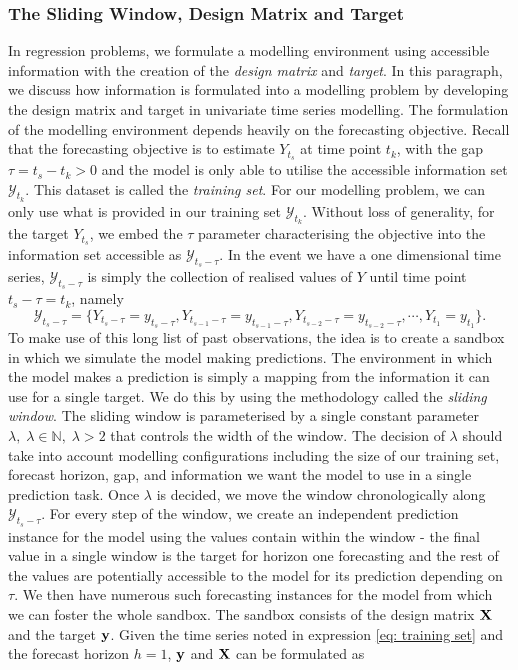 \subsubsection{The Sliding Window, Design Matrix and Target}
In regression problems, we formulate a modelling environment using accessible information with the creation of the \textit{design matrix} and \textit{target}. In this paragraph, we discuss how information is formulated into a modelling problem by developing the design matrix and target in univariate time series modelling. The formulation of the modelling environment depends heavily on the forecasting objective. Recall that the forecasting objective is to estimate $Y_{t_s}$ at time point $t_k$, with the gap $\tau = t_s - t_k > 0$ and the model is only able to utilise the accessible information set $\mathcal{Y}_{t_k}$. This dataset is called the \textit{training set}. For our modelling problem, we can only use what is provided in our training set $\mathcal{Y}_{t_k}$. Without loss of generality, for the target $Y_{t_s}$, we embed the $\tau$ parameter characterising the objective into the information set accessible as $\mathcal{Y}_{t_s - \tau}$. In the event we have a one dimensional time series, $\mathcal{Y}_{t_s-\tau}$ is simply the collection of realised values of $Y$ until time point $t_s-\tau = t_k$, namely
\begin{equation}\label{eq: training set}
    \mathcal{Y}_{t_s-\tau} = \{ Y_{t_s-\tau} = y_{t_s-\tau}, Y_{t_{s-1}-\tau} = y_{t_{s-1}-\tau}, Y_{t_{s-2}-\tau} = y_{t_{s-2}-\tau}, \cdots, Y_{t_1} = y_{t_1} \}.
\end{equation}
To make use of this long list of past observations, the idea is to create a sandbox in which we simulate the model making predictions. The environment in which the model makes a prediction is simply a mapping from the information it can use for a single target. We do this by using the methodology called the \textit{sliding window}. The sliding window is parameterised by a single constant parameter $\lambda, \; \lambda \in \mathbb{N}, \; \lambda > 2$ that controls the width of the window. The decision of $\lambda$ should take into account modelling configurations including the size of our training set, forecast horizon, gap, and information we want the model to use in a single prediction task. Once $\lambda$ is decided, we move the window chronologically along $\mathcal{Y}_{t_s -\tau}$. For every step of the window, we create an independent prediction instance for the model using the values contain within the window - the final value in a single window is the target for horizon one forecasting and the rest of the values are potentially accessible to the model for its prediction depending on $\tau$. We then have numerous such forecasting instances for the model from which we can foster the whole sandbox. The sandbox consists of the design matrix $\mathbf{X}$ and the target $\mathbf{y}$. Given the time series noted in expression \ref{eq: training set} and the forecast horizon $h=1$, $\mathbf{y}$ and $\mathbf{X}$ can be formulated as
